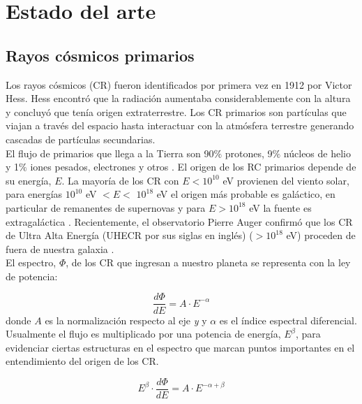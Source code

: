 \chapter{Estado del arte}

\label{ch:background}

\section{Rayos cósmicos primarios}

Los rayos cósmicos (CR) fueron identificados por primera vez en 1912 por Victor Hess. Hess encontró que la radiación aumentaba considerablemente con la altura y concluyó que tenía origen extraterrestre. Los CR primarios son partículas que viajan a través del espacio hasta interactuar con la atmósfera terrestre generando cascadas de partículas secundarias.\\

El flujo de primarios que llega a la Tierra son 90$\%$ protones, 9$\%$ núcleos de helio y 1$\%$ iones pesados, electrones y otros \cite{Spurio2015}. El origen de los RC primarios depende de su energía, $E$. La mayoría de los CR con $E<10^{10}$ eV provienen del viento solar, para energías $10^{10}$ eV $ < E <$ $10^{18}$ eV el origen más probable es galáctico, en particular de remanentes de supernovas y para $E>10^{18}$ eV la fuente es extragaláctica \cite{Procureur2018}. Recientemente, el observatorio Pierre Auger confirmó que los CR de Ultra Alta Energía (UHECR por sus siglas en inglés) ($> 10^{18}$ eV) proceden de fuera de nuestra galaxia \cite{Pierre2017}.\\

El espectro, $\Phi$, de los CR que ingresan a nuestro planeta se representa con la ley de potencia:

\begin{equation}
  \frac{d \Phi}{dE}  = A \cdot E^{- \alpha} 
\end{equation}
donde $A$ es la normalización respecto al eje \textit{y} y $\alpha$ es el índice espectral diferencial. 
Usualmente el flujo es multiplicado por una potencia de energía, $E^\beta$, para evidenciar ciertas estructuras en el espectro que marcan puntos importantes en el entendimiento del origen de los CR.

\begin{equation}
E^\beta \cdot \frac{d \Phi}{dE}  =   A \cdot E^{- \alpha + \beta}
\end{equation}

